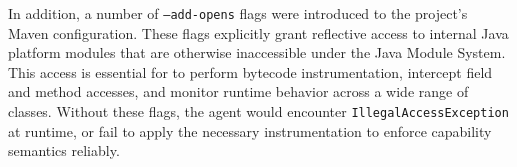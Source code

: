 In addition, a number of \texttt{--add-opens} flags were introduced to the project's Maven configuration. These flags explicitly grant reflective access to internal Java platform modules that are otherwise inaccessible under the Java Module System. This access is essential for \jdala to perform bytecode instrumentation, intercept field and method accesses, and monitor runtime behavior across a wide range of classes. Without these flags, the agent would encounter \texttt{IllegalAccessException} at runtime, or fail to apply the necessary instrumentation to enforce capability semantics reliably.

